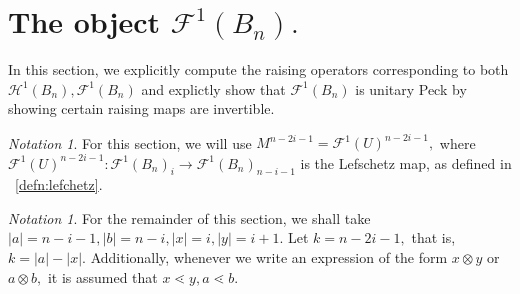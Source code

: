 \documentclass{amsart}
\theoremstyle{remark}
\newtheorem{note}[thm]{Notation}
\begin{document}
\section{The object $\mathcal F^1(B_n).$}
In this section, we explicitly compute the raising operators corresponding to both $\mathcal H^1(B_n),\mathcal F^1(B_n)$ and explictly show that $\mathcal F^1(B_n)$ is unitary Peck by showing certain raising maps are invertible.

\begin{note}
For this section, we will use $M^{n-2i-1} = \mathcal F^1(U)^{n-2i-1},$ where $\mathcal F^1(U)^{n-2i-1}:\mathcal F^1(B_n)_i \rightarrow \mathcal F^1(B_n)_{n-i-1}$ is the Lefschetz map, as defined in ~\ref{defn:lefchetz}.
\end{note}
\begin{note}
For the remainder of this section, we shall take $|a| = n-i-1,|b|= n-i,|x| = i,|y| = i+1.$ Let $k = n-2i-1,$ that is, $k = |a| - |x|.$ Additionally, whenever we write an expression of the form $x \otimes y$ or $a \otimes b,$ it is assumed that $x \lessdot y,a \lessdot b.$
\end{note}
\end{document}
